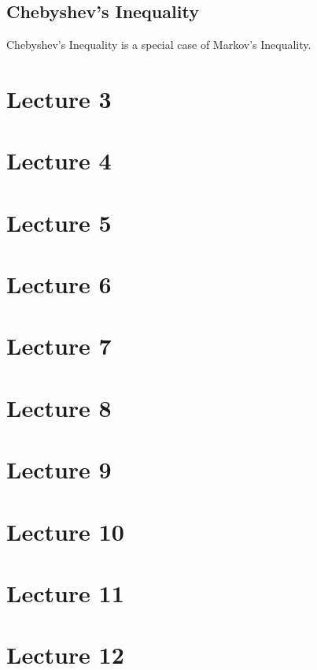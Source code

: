 \documentclass[11pt,twoside,a4paper,fleqn]{article}
\theoremstyle{plain}
\begin{document}
\subsection{Chebyshev's Inequality}
Chebyshev's Inequality is a special case of Markov's Inequality.



\newpage
\section{Lecture 3}
\section{Lecture 4}
\section{Lecture 5}
\section{Lecture 6}
\section{Lecture 7}
\section{Lecture 8}
\section{Lecture 9}
\section{Lecture 10}
\section{Lecture 11}
\section{Lecture 12}
\end{document}
